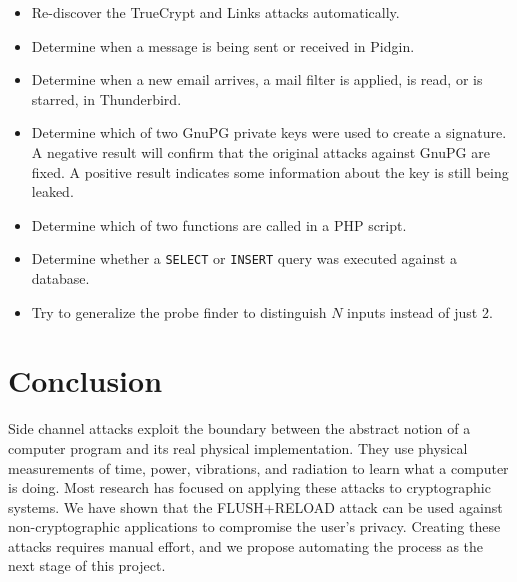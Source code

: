 \documentclass{acm_proc_article-sp}
\begin{document}
\begin{itemize}
    \item Re-discover the TrueCrypt and Links attacks automatically.
    \item Determine when a message is being sent or received in Pidgin.
    \item Determine when a new email arrives, a mail filter is applied, is read,
          or is starred, in Thunderbird.
    \item Determine which of two GnuPG private keys were used to create
          a signature. A negative result will confirm that the original attacks
          against GnuPG are fixed. A positive result indicates some information
          about the key is still being leaked.
    \item Determine which of two functions are called in a PHP script.
    \item Determine whether a \texttt{SELECT} or \texttt{INSERT} query was
          executed against a database.
    \item Try to generalize the probe finder to distinguish $N$ inputs instead
          of just 2.
\end{itemize}

\section{Conclusion}
\label{sec:conclusion}

Side channel attacks exploit the boundary between the abstract notion of
a computer program and its real physical implementation. They use physical
measurements of time, power, vibrations, and radiation to learn what a computer
is doing. Most research has focused on applying these attacks to cryptographic
systems. We have shown that the FLUSH+RELOAD attack can be used against
non-cryptographic applications to compromise the user's privacy. Creating these
attacks requires manual effort, and we propose automating the process as the
next stage of this project.



\end{document}
